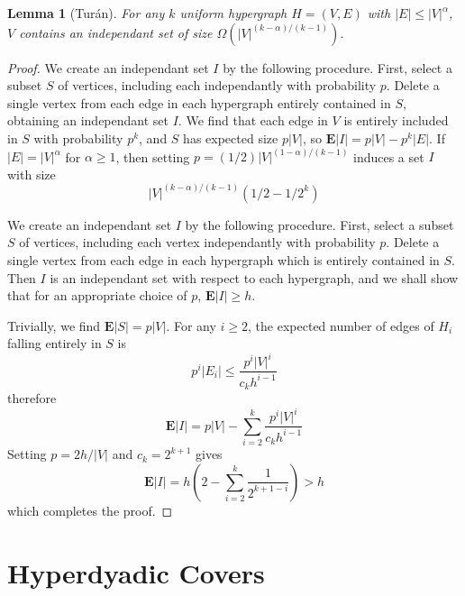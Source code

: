 \documentclass{report}
\theoremstyle{plain}
\newtheorem{lemma}{Lemma}
\theoremstyle{plain}
\begin{document}
\begin{lemma}[Tur\'{a}n]
    For any $k$ uniform hypergraph $H = (V,E)$ with $|E| \leq |V|^\alpha$, $V$ contains an independant set of size $\Omega(|V|^{(k-\alpha)/(k-1)})$.
\end{lemma}
\begin{proof}
    We create an independant set $I$ by the following procedure. First, select a subset $S$ of vertices, including each independantly with probability $p$. Delete a single vertex from each edge in each hypergraph entirely contained in $S$, obtaining an independant set $I$. We find that each edge in $V$ is entirely included in $S$ with probability $p^k$, and $S$ has expected size $p |V|$, so $\mathbf{E}|I| = p |V| - p^k |E|$. If $|E| = |V|^\alpha$ for $\alpha \geq 1$, then setting $p = (1/2) |V|^{(1 - \alpha)/(k-1)}$ induces a set $I$ with size
    \[ |V|^{(k - \alpha)/(k-1)}(1/2 - 1/2^k) \]

    We create an independant set $I$ by the following procedure. First, select a subset $S$ of vertices, including each vertex independantly with probability $p$. Delete a single vertex from each edge in each hypergraph which is entirely contained in $S$. Then $I$ is an independant set with respect to each hypergraph, and we shall show that for an appropriate choice of $p$, $\mathbf{E} |I| \geq h$.

    Trivially, we find $\mathbf{E}|S| = p |V|$. For any $i \geq 2$, the expected number of edges of $H_i$ falling entirely in $S$ is
    \[ p^i |E_i| \leq \frac{p^i |V|^i}{c_k h^{i-1}} \]
    therefore
    \[ \mathbf{E}|I| = p|V| - \sum_{i = 2}^k \frac{p^i |V|^i}{c_k h^{i-1}} \]
    Setting $p = 2h/|V|$ and $c_k = 2^{k+1}$ gives
    \[ \mathbf{E}|I| = h \left( 2 - \sum_{i = 2}^k \frac{1}{2^{k+1-i}} \right) > h \]
    which completes the proof.
\end{proof}

\section{Hyperdyadic Covers}
\end{document}
